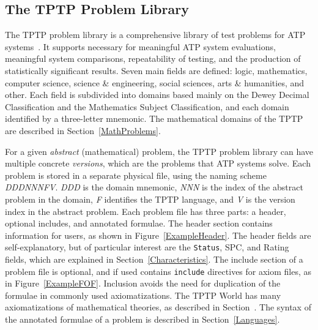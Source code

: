 \documentclass[runningheads]{llncs}
\begin{document}
\subsection{The TPTP Problem Library}
\label{TPTP}

The TPTP problem library is a comprehensive library of test problems for ATP systems~\cite{Sut09}.
It supports necessary for meaningful ATP system evaluations, meaningful system comparisons, 
repeatability of testing, and the production of statistically significant results. 
Seven main fields are defined: logic, mathematics, computer science, science \& engineering, 
social sciences, arts \& humanities, and other. 
Each field is subdivided into domains based mainly on the Dewey Decimal Classification and the 
Mathematics Subject Classification, and each domain identified by a three-letter mnemonic.
The mathematical domains of the TPTP are described in Section~\ref{MathProblems}.

For a given {\em abstract} (mathematical) problem, the TPTP problem library can have multiple 
concrete {\em versions}, which are the problems that ATP systems solve. 
Each problem is stored in a separate physical file, using the naming scheme {\em DDDNNNFV}.
{\em DDD} is the domain mnemonic, {\em NNN} is the index of the abstract problem in the domain,
{\em F} identifies the TPTP language, and {\em V} is the version index in the abstract problem.
Each problem file has three parts: a header, optional includes, and annotated formulae.
The header section contains information for users, as shown in Figure~\ref{ExampleHeader}.
The header fields are self-explanatory, but of particular interest are the {\tt Status}, SPC,
and Rating fields, which are explained in Section~\ref{Characteristics}.
The include section of a problem file is optional, and if used contains {\tt include} directives 
for axiom files, as in Figure~\ref{ExampleFOF}.
Inclusion avoids the need for duplication of the formulae in commonly used axiomatizations.
The TPTP World has many axiomatizations of mathematical theories, as described in 
Section~.
The syntax of the annotated formulae of a problem is described in Section~\ref{Languages}.
\end{document}
